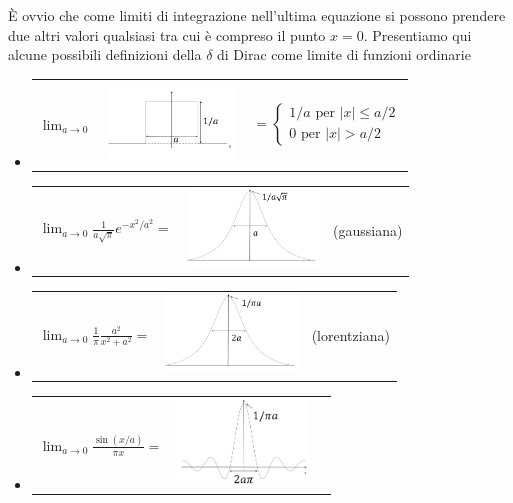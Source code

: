 \documentclass[a4paper,12pt,oneside]{book}
\begin{document}
È ovvio che come limiti di integrazione nell'ultima equazione si possono prendere due altri valori qualsiasi tra cui è compreso il punto $x=0$.
Presentiamo qui alcune possibili definizioni della $\delta$ di Dirac come limite di funzioni ordinarie
\begin{itemize}
\item
\begin{tabular}{ >{\centering\arraybackslash} m{1.5cm} >{\centering\arraybackslash} m{3.5cm} >{\centering\arraybackslash} m{4.5cm}}
$\displaystyle{\lim _{a \rightarrow 0}}$ & \includegraphics[width=3.5cm]{immagini/cap_5/fig_5_1.png}  & $=\displaystyle{\begin{cases}
1/a \textrm{ per } \vert x \vert \leq a/2\\
0 \textrm{ per } \vert x \vert > a/2
\end{cases}}$
\end{tabular}
\item
\begin{tabular}{ >{\centering\arraybackslash} m{4cm} >{\centering\arraybackslash} m{3.5cm} >{\centering\arraybackslash} m{2cm}}
$\displaystyle{\lim _{a \rightarrow 0}\frac{1}{a\sqrt{\pi}}e^{-x^2/a^2}=}$ & \includegraphics[width=3.5cm]{immagini/cap_5/fig_5_2.png}  & (gaussiana)
\end{tabular}
\item 
\begin{tabular}{ >{\centering\arraybackslash} m{4cm} >{\centering\arraybackslash} m{3.5cm} >{\centering\arraybackslash} m{2cm}}
$\displaystyle{\lim _{a \rightarrow 0}\frac{1}{\pi}\frac{a^2}{x^2+a^2}}=$ & \includegraphics[width=3.5cm]{immagini/cap_5/fig_5_3.png}  & (lorentziana)
\end{tabular}
\item 
\begin{tabular}{ >{\centering\arraybackslash} m{4cm} >{\centering\arraybackslash} m{3.5cm} >{\centering\arraybackslash} m{2cm}}
$\displaystyle{\lim _{a \rightarrow 0}\frac{\sin(x/a)}{\pi x}}=$ & \includegraphics[width=3.5cm]{immagini/cap_5/fig_5_4.png}  & 
\end{tabular}
\end{itemize}
\end{document}
